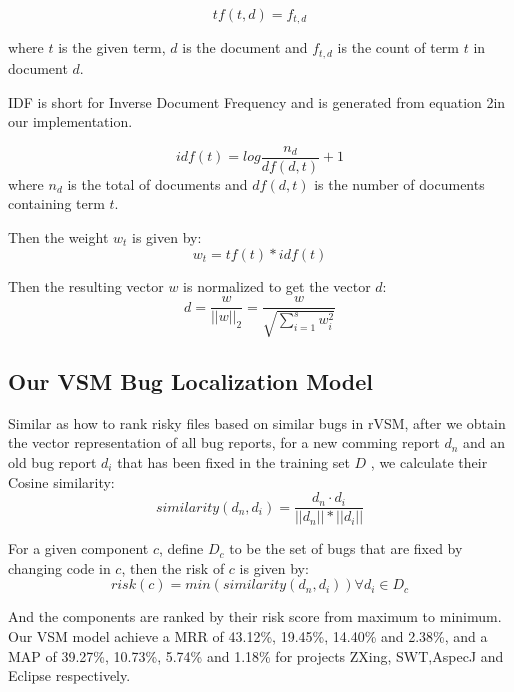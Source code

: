 \begin{equation}
	tf(t,d) = f_{t,d}
\end{equation}

where $t$ is the given term, $d$ is the document and $f_{t,d}$ is the count of term $t$ in document $d$.

IDF is short for Inverse Document Frequency and is generated from equation 2in our implementation.

\begin{equation}
	idf(t) = log\frac{n_d}{df(d,t)} +1
\end{equation}
where $n_d$ is the total of documents and $df(d,t)$ is the number of documents containing term $t$.

Then the weight $w_t$ is given by:
\begin{equation}
	w_t = tf(t)*idf(t)
\end{equation}
 
Then the resulting vector $w$ is normalized to get the vector $d$:
\begin{equation}
	d = \frac{w}{||w||_2} = \frac{w}{\sqrt{\sum_{i=1}^{s}w_i^2}}
\end{equation} 


\subsection{Our VSM Bug Localization Model}
Similar as how to rank risky files based on similar bugs in rVSM\cite{zhou2012should},
after we obtain the vector representation of all bug reports, for a new comming report $d_n$ and an old bug report $d_i$ that has been fixed in the training set $D$ , we calculate their Cosine similarity:
\begin{equation}
	similarity(d_n,d_i) = \frac{d_n \cdot d_i}{||d_n||*||d_i||}
\end{equation}

For a given component $c$, define $D_c$ to be the set of bugs that are fixed by changing code in $c$,  then the risk of $c$ is given by:
\begin{equation}
	risk(c) = min(similarity(d_n,d_i)) \forall d_i \in D_c
\end{equation}

And the components are ranked by their risk score from maximum to minimum.
Our VSM model achieve a MRR of 43.12\%, 19.45\%, 14.40\% and 2.38\%, and a MAP of 39.27\%, 10.73\%, 5.74\% and 1.18\%  for projects ZXing, SWT,AspecJ and Eclipse respectively. 





